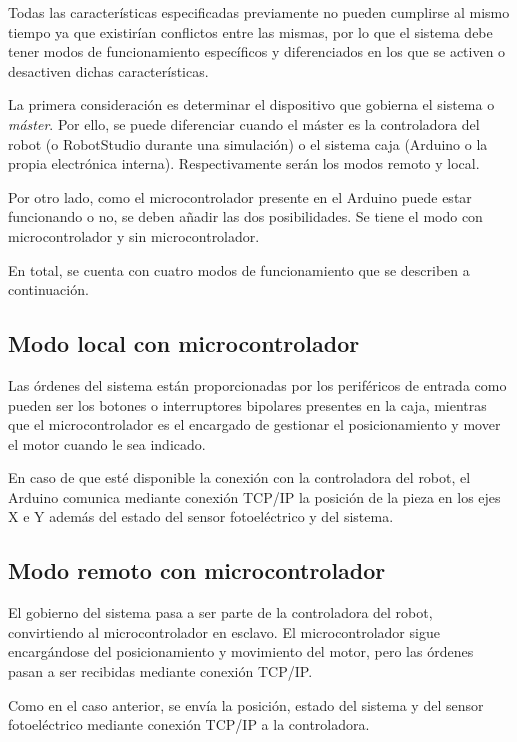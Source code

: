 Todas las características especificadas previamente no pueden cumplirse al mismo tiempo ya que 
existirían conflictos entre las mismas, por lo que el sistema debe tener modos de funcionamiento 
específicos y diferenciados en los que se activen o desactiven dichas características. 

La primera consideración es determinar el dispositivo que gobierna el sistema o \textit{máster}.
Por ello, se puede diferenciar cuando el máster es la controladora del robot (o RobotStudio durante
una simulación) o el sistema caja (Arduino o la propia electrónica interna). Respectivamente serán
los modos remoto y local.

Por otro lado, como el microcontrolador presente en el Arduino puede estar funcionando o no, se
deben añadir las dos posibilidades. Se tiene el modo con microcontrolador y sin microcontrolador.

En total, se cuenta con cuatro modos de funcionamiento que se describen a continuación.

\subsection{Modo local con microcontrolador}\label{subsec-01}

Las órdenes del sistema están proporcionadas por los periféricos de entrada como pueden ser los botones
o interruptores bipolares presentes en la caja, mientras que el microcontrolador es el encargado de 
gestionar el posicionamiento y mover el motor cuando le sea indicado.

En caso de que esté disponible la conexión con la controladora del robot, el Arduino comunica 
mediante conexión TCP/IP la posición de la pieza en los ejes X e Y además del estado
del sensor fotoeléctrico y del sistema.

\subsection{Modo remoto con microcontrolador}\label{subsec-02}

El gobierno del sistema pasa a ser parte de la controladora del robot, convirtiendo al microcontrolador
en esclavo. El microcontrolador sigue encargándose del posicionamiento y movimiento del motor, pero las
órdenes pasan a ser recibidas mediante conexión TCP/IP.

Como en el caso anterior, se envía la posición, estado del sistema y del sensor fotoeléctrico mediante
conexión TCP/IP a la controladora.


